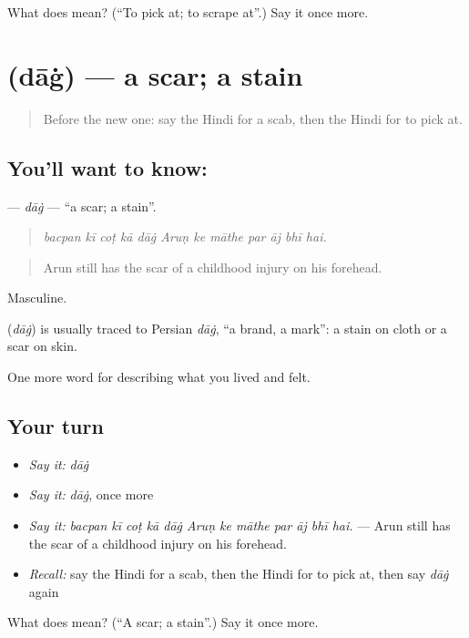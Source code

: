 \begin{tcolorbox}[breakable,colback=teal!4,colframe=teal!35!black,title={Before you move on}]
What does  mean? (\textquotedblleft{}To pick at; to scrape at\textquotedblright{}.) Say it once more.
\end{tcolorbox}
\section[\texorpdfstring{\hi{दाग़} (dāġ)}{दाग़ (dāġ)}]{ (dāġ) — a scar; a stain}

\label{lesson:HI-C490-dag}



\begin{quote}
Before the new one: say the Hindi for a scab, then the Hindi for to pick at.
\end{quote}

\subsection*{You'll want to know: }
\textbf{} — \emph{dāġ} — \textquotedblleft{}a scar; a stain\textquotedblright{}.

\begin{quote}
           
\end{quote}

\begin{quote}
\emph{bacpan kī coṭ kā dāġ Aruṇ ke māthe par āj bhī hai.}
\end{quote}

\begin{quote}
Arun still has the scar of a childhood injury on his forehead.
\end{quote}

Masculine.

\begin{cousinweb}
\textbf{} (\emph{dāġ}) is usually traced to Persian \emph{dāġ}, \textquotedblleft{}a brand, a mark\textquotedblright{}: a stain on cloth or a scar on skin.
\end{cousinweb}

\begin{grammarlens}[title={What you've built}]
One more word for describing what you lived and felt.
\end{grammarlens}

\subsection*{Your turn}
\begin{itemize}
\raggedright
  \item \emph{Say it:} \emph{dāġ}
  \item \emph{Say it:} \emph{dāġ}, once more
  \item \emph{Say it:} \emph{bacpan kī coṭ kā dāġ Aruṇ ke māthe par āj bhī hai.} — Arun still has the scar of a childhood injury on his forehead.
  \item \emph{Recall:} say the Hindi for a scab, then the Hindi for to pick at, then say \emph{dāġ} again
\end{itemize}

\begin{tcolorbox}[breakable,colback=teal!4,colframe=teal!35!black,title={Before you move on}]
What does  mean? (\textquotedblleft{}A scar; a stain\textquotedblright{}.) Say it once more.
\end{tcolorbox}
